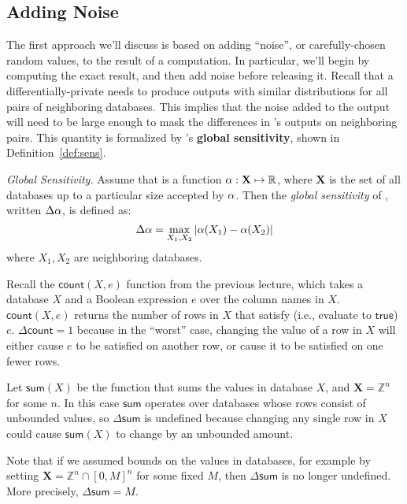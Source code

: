 \documentclass[11pt,twoside]{scrartcl}
\begin{document}
\subsection{Adding Noise} 
The first approach we'll discuss is based on adding ``noise'', or carefully-chosen random values, to the result of a computation. In particular, we'll begin by computing the exact result, and then add noise before releasing it. Recall that a differentially-private \san needs to produce outputs with similar distributions for all pairs of neighboring databases. This implies that the noise added to the output will need to be large enough to mask the differences in \san's outputs on neighboring pairs. This quantity is formalized by \san's \textbf{global sensitivity}, shown in Definition~\ref{def:sens}.

\begin{definition}{\emph{Global Sensitivity.}}
\label{def:sens}
Assume that \san is a function $\alpha : \mathbf{X} \mapsto \mathbb{R}$, where $\mathbf{X}$ is the set of all databases up to a particular size accepted by $\alpha$. Then the \emph{global sensitivity} of \san, written $\Delta\alpha$, is defined as:
\[
\Delta\alpha = \max\limits_{X_1, X_2} | \alpha(X_1) - \alpha(X_2) |
\]
where $X_1, X_2$ are neighboring databases.
\end{definition}

\begin{example}
Recall the $\mathsf{count}(X, e)$ function from the previous lecture, which takes a database $X$ and a Boolean expression $e$ over the column names in $X$. $\mathsf{count}(X, e)$ returns the number of rows in $X$ that satisfy (i.e., evaluate to $\mathsf{true}$) $e$. $\Delta \mathsf{count} = 1$ because in the ``worst'' case, changing the value of a row in $X$ will either cause $e$ to be satisfied on another row, or cause it to be satisfied on one fewer rows.
\end{example}

\begin{example}
Let $\mathsf{sum}(X)$ be the function that sums the values in database $X$, and $\mathbf{X} = \mathbb{Z}^n$ for some $n$. In this case $\mathsf{sum}$ operates over databases whose rows consist of unbounded values, so $\Delta\mathsf{sum}$ is undefined because changing any single row in $X$ could cause $\mathsf{sum}(X)$ to change by an unbounded amount.

Note that if we assumed bounds on the values in databases, for example by setting $\mathbf{X} = \mathbb{Z}^n \cap [0, M]^n$ for some fixed $M$, then $\Delta\mathsf{sum}$ is no longer undefined. More precisely, $\Delta\mathsf{sum} = M$.
\end{example}
\end{document}
